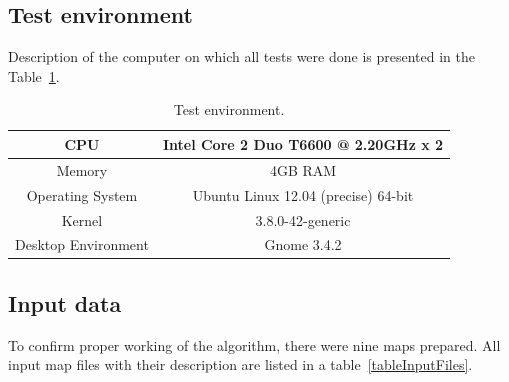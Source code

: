 \documentclass[a4paper,onecolumn,oneside,12pt]{memoir}
\begin{document}
\subsection{Test environment}

Description of the computer on which all tests were done is presented in the
Table~\ref{computerDescription}.

\begin{table}[!ht]
\begin{center}
\caption{Test environment.}
\label{computerDescription}
\begin{tabular}{|c|c|}
  \hline
  CPU & Intel Core 2 Duo T6600 @ 2.20GHz x 2 \\
  \hline
  Memory & 4GB RAM \\
  \hline
  Operating System & Ubuntu Linux 12.04 (precise) 64-bit \\
  Kernel & 3.8.0-42-generic \\
  Desktop Environment & Gnome 3.4.2 \\
  \hline
\end{tabular}
\end{center}
\end{table}

\subsection{Input data}

To confirm proper working of the algorithm, there were nine maps prepared. All input map files
with their description are listed in a table~\ref{tableInputFiles}. 
\end{document}
